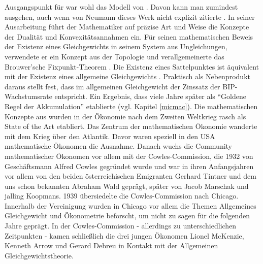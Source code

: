 Ausgangspunkt für \textcite{Neumann1937, Neumann1945} war wohl das Modell von \textcite{Cassel1918}. Davon kann man zumindest ausgehen, auch wenn von Neumann dieses Werk nicht explizit zitierte \parencite[S. 129]{Kurz1993}. In seiner Ausarbeitung führt der Mathematiker auf präzise Art und Weise die Konzepte der Dualität und Konvexitätsannahmen ein. Für seinen mathematischen Beweis der Existenz eines Gleichgewichts in seinem System aus Ungleichungen, verwendete er ein Konzept aus der Topologie und verallgemeinerte das Brouwer'sche Fixpunkt-Theorem \parencite[S. 1]{Neumann1945}. Die Existenz eines Sattelpunktes ist äquivalent mit der Existenz eines allgemeine Gleichgewichts \parencite[S. 14]{Weintraub1983}. Praktisch als Nebenprodukt daraus stellt \textcite{Neumann1945} fest, dass im allgemeinen Gleichgewicht der Zinssatz der BIP-Wachstumsrate entspricht. Ein Ergebnis, dass viele Jahre später \textcite{Phelps1961} als "`Goldene Regel der Akkumulation"' etablierte (vgl. Kapitel \ref{micmac}). Die mathematischen Konzepte aus \textcite{Neumann1945} wurden in der Ökonomie nach dem Zweiten Weltkrieg rasch als State of the Art etabliert. Das Zentrum der mathematischen Ökonomie wanderte mit dem Krieg über den Atlantik. Davor waren speziell in den USA mathematische Ökonomen die Ausnahme. Danach wuchs die Community mathematischer Ökonomen vor allem mit der Cowles-Commission, die 1932 von Geschäftsmann Alfred Cowles gegründet wurde und war in ihren Anfangsjahren vor allem von den beiden österreichischen Emigranten Gerhard Tintner und dem uns schon bekannten Abraham Wald geprägt, später von Jacob Marschak und jalling Koopmans. 1939 übersiedelte die Cowles-Commission nach Chicago. Innerhalb der Vereinigung wurden in Chicago vor allem die Themen Allgemeines Gleichgewicht und Ökonometrie beforscht, um nicht zu sagen für die folgenden Jahre geprägt. In der Cowles-Commission - allerdings zu unterschiedlichen Zeitpunkten - kamen schließlich die drei jungen Ökonomen Lionel McKenzie, Kenneth Arrow und Gerard Debreu in Kontakt mit der Allgemeinen Gleichgewichtstheorie.  

